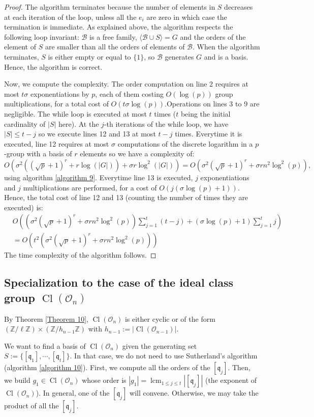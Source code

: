 \documentclass[a4paper,10pt]{report}
\theoremstyle{definition}
\theoremstyle{plain}
\theoremstyle{definition}
\newcommand{\Z}{\mathbb{Z}}
\newcommand{\m}[1]{\mathcal{#1}}
\newcommand{\mO}{\mathcal{O}}
\renewcommand{\(}{\left(}
\renewcommand{\)}{\right)}
\newcommand{\mf}[1]{\mathfrak{#1}}
\DeclareMathOperator{\Cl}{Cl}
\DeclareMathOperator{\lcm}{lcm}
\begin{document}
\begin{proof}
The algorithm terminates because the number of elements in $S$ decreases at each iteration of the loop, unless all the $e_i$ are zero in which case the termination is immediate.  As explained above, the algorithm respects the following loop invariant: $\m{B}$ is a free family, $\langle\m{B}\cup S\rangle=G$ and the orders of the element of $S$ are smaller than all the orders of elements of $\m{B}$.  When the algorithm terminates, $S$ is either empty or equal to $\{1\}$, so $\m{B}$ generates $G$ and is a basis. Hence, the algorithm is correct.

Now, we compute the complexity. The order computation on line 2 requires at most $t\sigma$ exponentiations by $p$, each of them costing $O(\log(p))$ group multiplications, for a total cost of $O(t\sigma\log(p))$.Operations on lines 3 to 9 are negligible. The while loop is executed at most $t$ times ($t$ being the initial cardinality of $|S|$ here). At the $j$-th iterations of the while loop, we have $|S|\leq t-j$ so we execute lines 12 and 13 at most $t-j$ times. Everytime it is executed, line 12 requires at most $\sigma$ computations of the discrete logarithm in a $p$-group with a basis of $r$ elements so we have a complexity of:
\[O(\sigma^2((\sqrt{p}+1)^r+r\log(|G|))+\sigma r\log^2(|G|))=O(\sigma^2(\sqrt{p}+1)^r+\sigma rn^2\log^2(p)),\]
using algorithm \ref{algorithm 9}.  Everytime line 13 is executed, $j$ exponentiations and $j$ multiplications are performed, for a cost of $O(j(\sigma\log(p)+1))$. Hence, the total cost of line 12 and 13 (counting the number of times they are executed) is:
\begin{align*}&O\((\sigma^2(\sqrt{p}+1)^r+\sigma rn^2\log^2(p))\sum_{j=1}^t(t-j)+(\sigma\log(p)+1)\sum_{j=1}^t j\)\\
&=O(t^2(\sigma^2(\sqrt{p}+1)^r+\sigma rn^2\log^2(p)))
\end{align*}
The time complexity of the algorithm follows.
\end{proof}

\subsection{Specialization to the case of the ideal class group $\Cl(\mO_n)$}

By Theorem \ref{Theorem 10}, $\Cl(\mO_n)$ is either cyclic or of the form $(\Z/\ell\Z)\times(\Z/h_{n-1}\Z)$ with $h_{n-1}:=|\Cl(\mO_{n-1})|$. 

We want to find a basis of $\Cl(\mO_n)$ given the generating set $S:=\{[\mf{q}_1], \cdots, [\mf{q}_t]\}$. In that case, we do not need to use Sutherland's algorithm (algorithm \ref{algorithm 10}). First, we compute all the orders of the $[\mf{q}_j]$. Then, we build $g_1\in \Cl(\mO_n)$ whose order is $|g_1|=\lcm_{1\leq j\leq t}|[\mf{q}_j]|$ (the exponent of $\Cl(\mO_n)$). In general, one of the $[\mf{q}_j]$ will convene. Otherwise, we may take the product of all the $[\mf{q}_j]$. 
\end{document}
